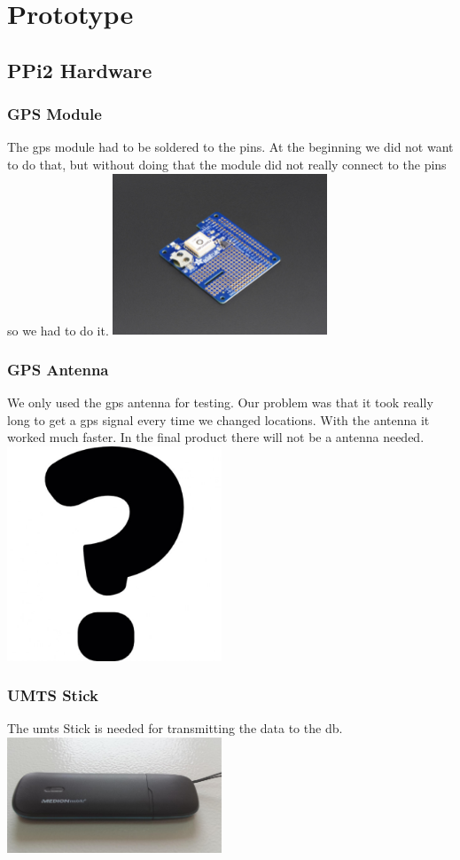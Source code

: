 
\chapter{Prototype}
\section{PPi2 Hardware}
\subsection{GPS Module}
    
The \gls{gps} module had to be soldered to the pins. At the beginning we did not want to do that, but without doing that the module did not really connect to the pins so we had to do it.\newline
\includegraphics[width=0.48\textwidth]{bilder/GPS}
\subsection{GPS Antenna}
We only used the \gls{gps} antenna for testing. Our problem was that it took really long to get a \gls{gps} signal every time we changed locations. With the antenna it worked much faster. In the final product there will not be a antenna needed. \newline 
\includegraphics[width=0.48\textwidth]{bilder/Antenna}
\subsection{UMTS Stick}
The \gls{umts} Stick is needed for transmitting the data to the \gls{db}.\newline
\includegraphics[width=0.48\textwidth]{bilder/Medion_3}
